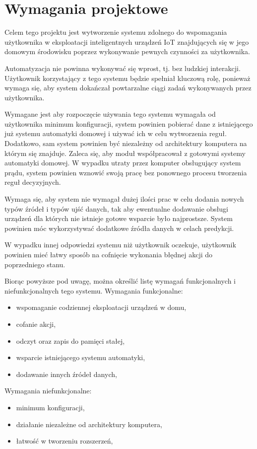 \chapter{Wymagania projektowe}
\label{chapter:wymagania}
Celem tego projektu jest wytworzenie systemu zdolnego do wspomagania użytkownika w eksploatacji inteligentnych urządzeń IoT znajdujących się w jego domowym środowisku poprzez wykonywanie pewnych czynności za użytkownika. 

Automatyzacja nie powinna wykonywać się wprost, tj. bez ludzkiej interakcji. Użytkownik korzystający z tego systemu będzie spełniał kluczową rolę, ponieważ wymaga się, aby system dokańczał powtarzalne ciągi zadań wykonywanych przez użytkownika.

Wymagane jest aby rozpoczęcie używania tego systemu wymagała od użytkownika minimum konfiguracji, system powinien pobierać dane z istniejącego już systemu automatyki domowej i używać ich w celu wytworzenia reguł. Dodatkowo, sam system powinien być niezależny od architektury komputera na którym się znajduje. Zaleca się, aby moduł współpracował z gotowymi systemy automatyki domowej. W wypadku utraty przez komputer obsługujący system prądu, system powinien wznowić swoją pracę bez ponownego procesu tworzenia reguł decyzyjnych.

Wymaga się, aby system nie wymagał dużej ilości prac w celu dodania nowych typów źródeł i typów ujść danych, tak aby ewentualne dodawanie obsługi urządzeń dla których nie istnieje gotowe wsparcie było najprostsze. System powinien móc wykorzystywać dodatkowe źródła danych w celach predykcji.

W wypadku innej odpowiedzi systemu niż użytkownik oczekuje, użytkownik powinien mieć łatwy sposób na cofnięcie wykonania błędnej akcji do poprzedniego stanu.

Biorąc powyższe pod uwagę, można określić listę wymagań funkcjonalnych i niefunkcjonalnych tego systemu.
Wymagania funkcjonalne:
\begin{itemize}
    \item wspomaganie codziennej eksploatacji urządzeń w domu,
    \item cofanie akcji,
    \item odczyt oraz zapis do pamięci stałej,
    \item wsparcie istniejącego systemu automatyki,
    \item dodawanie innych źródeł danych,
\end{itemize}
Wymagania niefunkcjonalne:
\begin{itemize}
    \item minimum konfiguracji,
    \item działanie niezależne od architektury komputera,
    \item łatwość w tworzeniu rozszerzeń,
\end{itemize}

